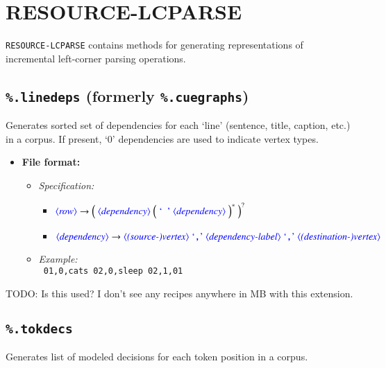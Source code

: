 \documentclass[12pt]{report}
\def\blue{\color{blue}}
\def\magenta{\color{magenta}}
\def\red{\color{red}}
\begin{document}
\chapter{RESOURCE-LCPARSE}

{\tt RESOURCE-LCPARSE} contains methods for generating representations of incremental left-corner parsing operations.

\section{{\blue\tt \%.linedeps} (formerly {\red\tt \%.cuegraphs})}
Generates sorted set of dependencies for each `line' (sentence, title, caption, etc.) in a corpus. If present, `0' dependencies are used to indicate vertex types.

\begin{itemize}
      \item \textbf{File format:}
      \begin{itemize}
            \item \textit{Specification:}
            \begin{itemize}
                  \item {\small $\dtype{row}        \rightarrow \Big( \ \dtype{dependency} \ \Big( \ \dcode{\ } \ \dtype{dependency} \ \Big)^* \ \Big)^?$}
                  \item {\small $\dtype{dependency} \rightarrow \dtype{(source-)vertex} \ \dcode{,} \ \dtype{dependency-label} \ \dcode{,} \ \dtype{(destination-)vertex}$}
            \end{itemize}
            \item \textit{Example:}\\
            {\magenta\tt
            01,0,cats 02,0,sleep 02,1,01
            }
      \end{itemize}
\end{itemize}

TODO: Is this used? I don't see any recipes anywhere in MB with this extension.

\section{{\blue\tt \%.tokdecs}}

Generates list of modeled decisions for each token position in a corpus.
\end{document}
